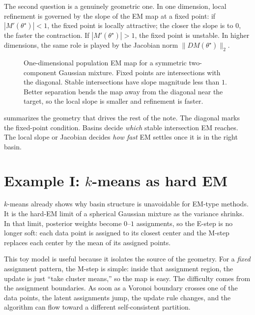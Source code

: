 \documentclass[11pt]{article}
\begin{document}
The second question is a genuinely geometric one.
In one dimension, local refinement is governed by the slope of the EM map at a fixed point:
if $|M'(\theta^\star)|<1$, the fixed point is locally attractive; the closer the slope is to $0$, the faster the contraction.
If $|M'(\theta^\star)|>1$, the fixed point is unstable.
In higher dimensions, the same role is played by the Jacobian norm $\|DM(\theta^\star)\|_2$.

\begin{figure}[t]
  \centering
  
  \caption{One-dimensional population EM map for a symmetric two-component Gaussian mixture. Fixed points are intersections with the diagonal. Stable intersections have slope magnitude less than $1$. Better separation bends the map away from the diagonal near the target, so the local slope is smaller and refinement is faster.}
  \label{fig:em-operator-fixed-points}
\end{figure}

 summarizes the geometry that drives the rest of the note.
The diagonal marks the fixed-point condition.
Basins decide \emph{which} stable intersection EM reaches.
The local slope or Jacobian decides \emph{how fast} EM settles once it is in the right basin.

\clearpage
\section[\texorpdfstring{$k$}{k}-means as hard EM]{Example I: \texorpdfstring{$k$}{k}-means as hard EM}
\label{sec:kmeans-basin-picture}

$k$-means already shows why basin structure is unavoidable for EM-type methods.
It is the hard-EM limit of a spherical Gaussian mixture as the variance shrinks.
In that limit, posterior weights become $0$--$1$ assignments, so the E-step is no longer soft:
each data point is assigned to its closest center and the M-step replaces each center by the mean of its assigned points.

This toy model is useful because it isolates the source of the geometry.
For a \emph{fixed} assignment pattern, the M-step is simple:
inside that assignment region, the update is just ``take cluster means,'' so the map is easy.
The difficulty comes from the assignment boundaries.
As soon as a Voronoi boundary crosses one of the data points, the latent assignments jump, the update rule changes, and the algorithm can flow toward a different self-consistent partition.
\end{document}
